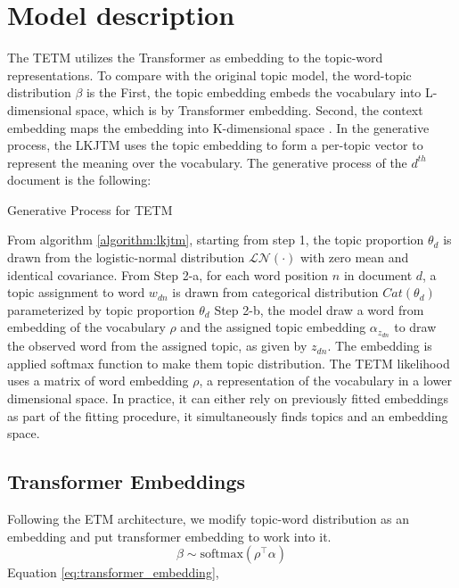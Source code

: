 \section{Model description}
The TETM utilizes the Transformer as embedding to the topic-word representations. To compare with the original topic model, the word-topic distribution $ \beta $ is the 
First, the topic embedding embeds the vocabulary into L-dimensional space, which is by Transformer embedding. Second, the context embedding maps the embedding into K-dimensional space . 
In the generative process, the LKJTM uses the topic embedding to form a per-topic vector to represent the meaning over the vocabulary. 
The generative process of the $ d^{th} $ document is the following:\\
\begin{algorithm}[H]
\caption{Generative Process for TETM}
\label{algorithm:lkjtm}
\end{algorithm}
From algorithm \ref{algorithm:lkjtm}, starting from step 1, the topic proportion $ \theta_d $ is drawn from the logistic-normal distribution $ \mathcal{LN}(\cdot) $ with zero mean and identical covariance.
From Step 2-a, for each word position $ n $ in document $ d $, a topic assignment to word $ w_{dn} $ is drawn from categorical distribution $ Cat(\theta_d) $ parameterized by topic proportion $ \theta_d $
Step 2-b, the model draw a word from embedding of the vocabulary $ \rho $ and the assigned topic embedding $ \alpha_{z_{dn}} $ to draw the observed word from the assigned topic, as given by $ z_{dn} $. The embedding is applied softmax function to make them topic distribution.
The TETM likelihood uses a matrix of word embedding $ \rho $, a representation of the vocabulary in a lower dimensional space. In practice, it can either rely on previously fitted embeddings as part of the fitting procedure, it simultaneously finds topics and an embedding space.


\subsection{Transformer Embeddings}
Following the ETM architecture, we modify topic-word distribution as an embedding and put transformer embedding to work into it. 
\begin{equation}\label{eq:transformer_embedding}
\beta\sim\text{softmax}(\rho^\top\alpha)
\end{equation}
Equation \ref{eq:transformer_embedding}, 
